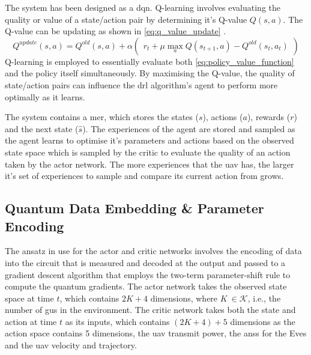 The system has been designed as a \acrfull{dqn}. 
Q-learning involves evaluating the quality or value of a state/action pair by determining it's Q-value $Q(s, a)$. 
The Q-value can be updating as shown in \ref{eq:q_value_update} \cite{murphy2025reinforcementlearningoverview}. 
\begin{equation} \label{eq:q_value_update}
   Q^{update} (s, a) = Q^{old} (s, a) + \alpha \begin{pmatrix}
       r_t + \mu \underset{a}{\max} Q (s_{t+1}, a) - Q^{old} (s_{t}, a_{t})
   \end{pmatrix}
\end{equation}
Q-learning is employed to essentially evaluate both \ref{eq:policy_value_function} and the policy itself simultaneously. 
By maximising the Q-value, the quality of state/action pairs can influence the \acrshort{drl} algorithm's agent to perform more optimally as it learns.

The system contains a \acrshort{mer}, which stores the states ($s$), actions ($a$), rewards ($r$) and the next state ($\hat{s}$). 
The experiences of the agent are stored and sampled as the agent learns to optimise it's parameters and actions based on the observed state space which is sampled by the critic to evaluate the quality of an action taken by the actor network. 
The more experiences that the \acrshort{uav} has, the larger it's set of experiences to sample and compare its current action from grows.

\subsection{Quantum Data Embedding \& Parameter Encoding}
The ansatz in use for the actor and critic networks involves the encoding of data into the circuit that is measured and decoded at the output and passed to a gradient descent algorithm that employs the two-term parameter-shift rule to compute the quantum gradients. 
The actor network takes the observed state space at time $t$, which contains $2K+4$ dimensions, where $K\ \in \mathcal{K}$, i.e., the number of \acrshort{gu}s in the environment. 
The critic network takes both the state and action at time $t$ as its inputs, which contains $(2K+4)+5$ dimensions as the action space contains 5 dimensions, the \acrshort{uav} transmit power, the \acrshort{ans}s for the Eves and the \acrshort{uav} velocity and trajectory. 

